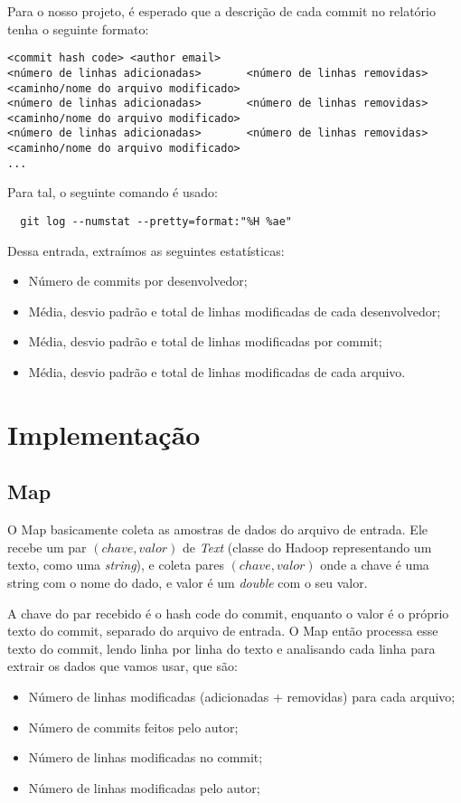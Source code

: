 Para o nosso projeto, é esperado que a descrição de cada commit no relatório tenha o seguinte
formato:

\begin{tiny}
\begin{verbatim}
<commit hash code> <author email>
<número de linhas adicionadas>       <número de linhas removidas>       <caminho/nome do arquivo modificado>
<número de linhas adicionadas>       <número de linhas removidas>       <caminho/nome do arquivo modificado>
<número de linhas adicionadas>       <número de linhas removidas>       <caminho/nome do arquivo modificado>
...
\end{verbatim}
\end{tiny}

Para tal, o seguinte comando é usado: 
\begin{verbatim}
  git log --numstat --pretty=format:"%H %ae"
\end{verbatim}

Dessa entrada, extraímos as seguintes estatísticas:
\begin{itemize}
\item Número de commits por desenvolvedor;
\item Média, desvio padrão e total de linhas modificadas de cada desenvolvedor;
\item Média, desvio padrão e total de linhas modificadas por commit;
\item Média, desvio padrão e total de linhas modificadas de cada arquivo.
\end{itemize}

\section{Implementação}

\subsection{Map}
O Map basicamente coleta as amostras de dados do arquivo de entrada. Ele recebe um par $(chave, valor)$
de \textit{Text} (classe do Hadoop representando um texto, como uma \textit{string}), e coleta pares
$(chave, valor)$ onde a chave é uma string com o nome do dado, e valor é um \textit{double} com o seu valor.

A chave do par recebido é o hash code do commit, enquanto o valor é o próprio texto do commit, 
separado do arquivo de entrada. O Map então processa esse texto do commit, lendo linha por linha do
texto e analisando cada linha para extrair os dados que vamos usar, que são:
\begin{itemize}
  \item Número de linhas modificadas (adicionadas + removidas) para cada arquivo;
  \item Número de commits feitos pelo autor;
  \item Número de linhas modificadas no commit;
  \item Número de linhas modificadas pelo autor;
\end{itemize}

